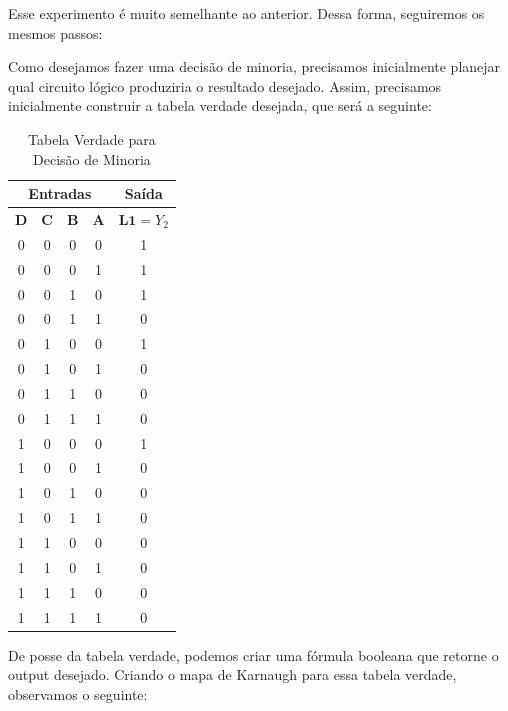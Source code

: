 \documentclass[12pt]{article}
\begin{document}
Esse experimento é muito semelhante ao anterior. Dessa forma, seguiremos os
mesmos passos:

Como desejamos fazer uma decisão de minoria, precisamos inicialmente planejar
qual circuito lógico produziria o resultado desejado. Assim, precisamos
inicialmente construir a tabela verdade desejada, que será a seguinte:

\begin{table}[H]
    \centering
    \caption{Tabela Verdade para Decisão de Minoria}
    \begin{tabular}{|c|c|c|c|c|}\hline
    \multicolumn{4}{|c|}{Entradas} & \multicolumn{1}{|c|}{Saída} \\\hline
    \textbf{D} & \textbf{C} & \textbf{B} & \textbf{A} & $\textbf{L1}=Y_{2}$ \\\hline
    0 & 0 & 0 & 0 & 1 \\\hline
    0 & 0 & 0 & 1 & 1 \\\hline
    0 & 0 & 1 & 0 & 1 \\\hline
    0 & 0 & 1 & 1 & 0 \\\hline
    0 & 1 & 0 & 0 & 1 \\\hline
    0 & 1 & 0 & 1 & 0 \\\hline
    0 & 1 & 1 & 0 & 0 \\\hline
    0 & 1 & 1 & 1 & 0 \\\hline
    1 & 0 & 0 & 0 & 1 \\\hline
    1 & 0 & 0 & 1 & 0 \\\hline
    1 & 0 & 1 & 0 & 0 \\\hline
    1 & 0 & 1 & 1 & 0 \\\hline
    1 & 1 & 0 & 0 & 0 \\\hline
    1 & 1 & 0 & 1 & 0 \\\hline
    1 & 1 & 1 & 0 & 0 \\\hline
    1 & 1 & 1 & 1 & 0 \\\hline
    \end{tabular}\label{tab:decisao_minoria}
\end{table}

De posse da tabela verdade, podemos criar uma fórmula booleana que retorne o
output desejado. Criando o mapa de Karnaugh para essa tabela verdade, observamos
o seguinte:
\end{document}
